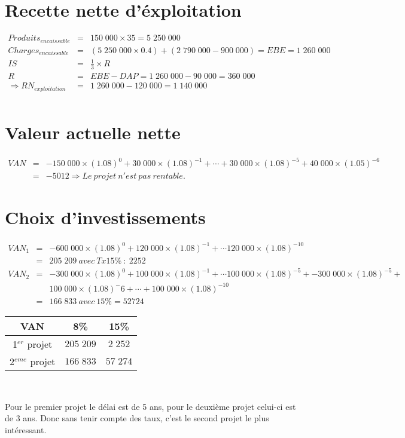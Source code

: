 \documentclass{article}
\begin{document}
	\maketitle
	\section{Recette nette d'éxploitation}
		\begin{eqnarray*}
			Produits_{encaissable} &=& 150\;000 \times 35 = 5\;250\;000	\\
			Charges_{encaissable} &=& (5\;250\;000 \times 0.4) + (2\;790\;000 - 900\;000) = EBE = 1\;260\;000\\                 
			IS &=& \frac{1}{3} \times R\\
			R &=& EBE - DAP = 1\;260\;000 - 90\;000 = 360\;000\\
			\Longrightarrow RN_{exploitation} &=& 1\;260\;000 - 120\;000 = 1\;140\;000\\
		\end{eqnarray*}
	\section{Valeur actuelle nette}
		\begin{eqnarray*}
			VAN &=&	-150\;000 \times (1.08)^0 + 
					30\;000 \times (1.08)^{-1} + \cdots
					+ 30\;000 \times (1.08)^{-5} +
					40\;000 \times (1.05)^{-6}\\
					&=& -5012 \Rightarrow Le~projet~n'est~pas~rentable.
		\end{eqnarray*}
	\section{Choix d'investissements}
		\begin{eqnarray*}
			VAN_1 &=&-600\;000 \times (1.08)^0 + 
					120\;000 \times (1.08)^{-1} + \cdots
					120\;000 \times (1.08)^{-10} \\
					&=& 205\;209~avec~Tx15\%~:~2252\\
			VAN_2 &=&-300\;000 \times (1.08)^0 + 
					100\;000 \times (1.08)^{-1} + \cdots
					100\;000 \times (1.08)^{-5} +
					-300\;000 \times (1.08)^{-5} + \\&& 100\;000 \times (1.08)^-6 + \cdots + 100\;000 \times (1.08)^{-10}\\
					&=& 166\;833~avec~15\%=52724
		\end{eqnarray*}
		\begin{center}
		\begin{tabular}{c|c|c}
			VAN & 8\% & 15\%\\
			\hline
			1$^{er}$ projet & $205\;209$ & $2\;252$\\
			\hline
			2$^{eme}$ projet & $166\;833$ & $57\;274$\\
		\end{tabular}\\
	\end{center}
		Pour le premier projet le délai est de 5 ans, pour le deuxième projet celui-ci est de 3 ans. Donc sans tenir compte des taux, c'est le second projet le plus intéressant.
\end{document}
